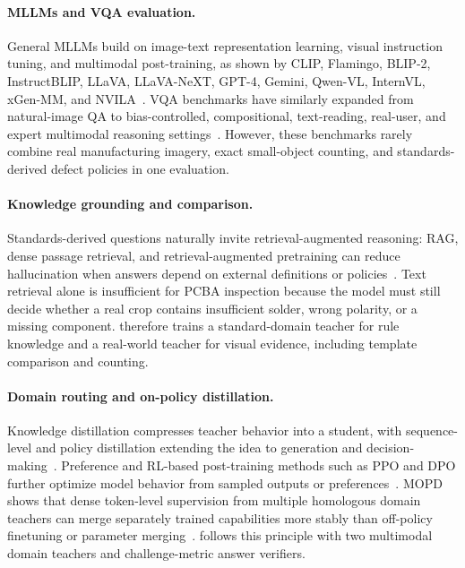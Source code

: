 \documentclass[sigconf, screen, review, anonymous]{acmart}
\begin{document}
\paragraph{MLLMs and VQA evaluation.}
General MLLMs build on image-text representation learning, visual instruction tuning, and multimodal post-training, as shown by CLIP, Flamingo, BLIP-2, InstructBLIP, LLaVA, LLaVA-NeXT, GPT-4, Gemini, Qwen-VL, InternVL, xGen-MM, and NVILA~\cite{radford2021clip,alayrac2022flamingo,li2023blip2,dai2023instructblip,liu2023llava,Liu24,openai2023gpt4,comanici2025gemini,bai2025qwen25vltechnicalreport,bai2025qwen3,chen2025expandingperformanceboundariesopensource,wang2025internvl35advancingopensourcemultimodal,xue2024xgen,liu2025nvila}. VQA benchmarks have similarly expanded from natural-image QA to bias-controlled, compositional, text-reading, real-user, and expert multimodal reasoning settings~\cite{antol2015vqa,goyal2017making,hudson2019gqa,singh2019textvqa,gurari2018vizwiz,fu2023mme,liu2023mmbench,lu2024mathvista,yue2024mmmu,jiang2025vknowu}. However, these benchmarks rarely combine real manufacturing imagery, exact small-object counting, and standards-derived defect policies in one evaluation.

\paragraph{Knowledge grounding and comparison.}
Standards-derived questions naturally invite retrieval-augmented reasoning: RAG, dense passage retrieval, and retrieval-augmented pretraining can reduce hallucination when answers depend on external definitions or policies~\cite{lewis2020rag,karpukhin2020dense,guu2020realm}. Text retrieval alone is insufficient for PCBA inspection because the model must still decide whether a real crop contains insufficient solder, wrong polarity, or a missing component. \method{} therefore trains a standard-domain teacher for rule knowledge and a real-world teacher for visual evidence, including template comparison and counting.

\paragraph{Domain routing and on-policy distillation.}
Knowledge distillation compresses teacher behavior into a student, with sequence-level and policy distillation extending the idea to generation and decision-making~\cite{hinton2015distilling,kim2016sequence,rusu2016policy}. Preference and RL-based post-training methods such as PPO and DPO further optimize model behavior from sampled outputs or preferences~\cite{schulman2017ppo,rafailov2023direct}. MOPD shows that dense token-level supervision from multiple homologous domain teachers can merge separately trained capabilities more stably than off-policy finetuning or parameter merging~\cite{ma2026mopd}. \method{} follows this principle with two multimodal domain teachers and challenge-metric answer verifiers.
\end{document}
